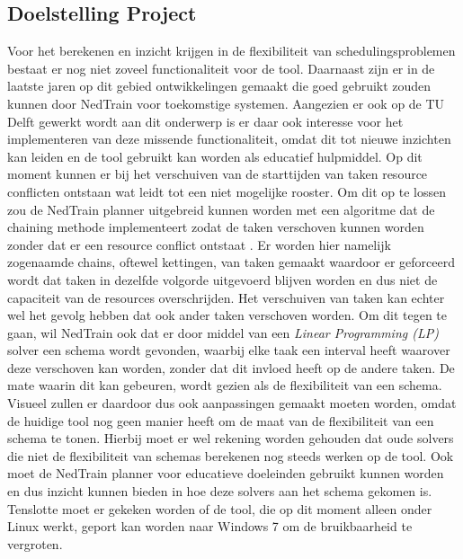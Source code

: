 \subsection{Doelstelling Project}
Voor het berekenen en inzicht krijgen in de flexibiliteit van schedulingsproblemen bestaat er nog niet zoveel functionaliteit voor de tool. Daarnaast zijn er in de laatste jaren op dit gebied ontwikkelingen gemaakt die goed gebruikt zouden kunnen door NedTrain voor toekomstige systemen. Aangezien er ook op de TU Delft gewerkt wordt aan dit onderwerp is er daar ook interesse voor het implementeren van deze missende functionaliteit, omdat dit tot nieuwe inzichten kan leiden en de tool gebruikt kan worden als educatief hulpmiddel. Op dit moment kunnen er bij het verschuiven van de starttijden van taken resource conflicten ontstaan wat leidt tot een niet mogelijke rooster. Om dit op te lossen zou de NedTrain planner uitgebreid kunnen worden met een algoritme dat de chaining methode implementeert zodat de taken verschoven kunnen worden zonder dat er een resource conflict ontstaat \cite{seminarium2014}. Er worden hier namelijk zogenaamde chains, oftewel kettingen, van taken gemaakt waardoor er geforceerd wordt dat taken in dezelfde volgorde uitgevoerd blijven worden en dus niet de capaciteit van de resources overschrijden. Het verschuiven van taken kan echter wel het gevolg hebben dat ook ander taken verschoven worden. Om dit tegen te gaan, wil NedTrain ook dat er door middel van een \emph{Linear Programming (LP)} solver een schema wordt gevonden, waarbij elke taak een interval heeft waarover deze verschoven kan worden, zonder dat dit invloed heeft op de andere taken. De mate waarin dit kan gebeuren, wordt gezien als de flexibiliteit van een schema. Visueel zullen er daardoor dus ook aanpassingen gemaakt moeten worden, omdat de huidige tool nog geen manier heeft om de maat van de flexibiliteit van een schema te tonen. Hierbij moet er wel rekening worden gehouden dat oude solvers die niet de flexibiliteit van schemas berekenen nog steeds werken op de tool. Ook moet de NedTrain planner voor educatieve doeleinden gebruikt kunnen worden en dus inzicht kunnen bieden in hoe deze solvers aan het schema gekomen is. Tenslotte moet er gekeken worden of de tool, die op dit moment alleen onder Linux werkt, geport kan worden naar Windows 7 om de bruikbaarheid te vergroten.

